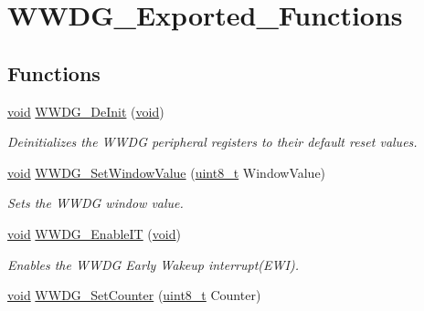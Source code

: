\hypertarget{group___w_w_d_g___exported___functions}{}\section{W\+W\+D\+G\+\_\+\+Exported\+\_\+\+Functions}
\label{group___w_w_d_g___exported___functions}
\subsection*{Functions}
\begin{DoxyCompactItemize}
\item 
\hyperlink{usb__devapi_8h_afabf60e7f57651d6d595a02c75f07cd0}{void} \hyperlink{group___w_w_d_g___exported___functions_ga7130f4dc861b9234b62e73f9f57f89a1}{W\+W\+D\+G\+\_\+\+De\+Init} (\hyperlink{usb__devapi_8h_afabf60e7f57651d6d595a02c75f07cd0}{void})
\begin{DoxyCompactList}\small\item\em Deinitializes the W\+W\+DG peripheral registers to their default reset values. \end{DoxyCompactList}\item 
\hyperlink{usb__devapi_8h_afabf60e7f57651d6d595a02c75f07cd0}{void} \hyperlink{group___w_w_d_g___exported___functions_gaf44a7bf8bf6b11b41cd89ff521fdd5a5}{W\+W\+D\+G\+\_\+\+Set\+Window\+Value} (\hyperlink{_p_e___types_8h_aba7bc1797add20fe3efdf37ced1182c5}{uint8\+\_\+t} Window\+Value)
\begin{DoxyCompactList}\small\item\em Sets the W\+W\+DG window value. \end{DoxyCompactList}\item 
\hyperlink{usb__devapi_8h_afabf60e7f57651d6d595a02c75f07cd0}{void} \hyperlink{group___w_w_d_g___exported___functions_gac8af66ea5254d3d78b60b9b7c7f29521}{W\+W\+D\+G\+\_\+\+Enable\+IT} (\hyperlink{usb__devapi_8h_afabf60e7f57651d6d595a02c75f07cd0}{void})
\begin{DoxyCompactList}\small\item\em Enables the W\+W\+DG Early Wakeup interrupt(\+E\+W\+I). \end{DoxyCompactList}\item 
\hyperlink{usb__devapi_8h_afabf60e7f57651d6d595a02c75f07cd0}{void} \hyperlink{group___w_w_d_g___exported___functions_ga6e44cc35f133b28b9ad861f459bf8d76}{W\+W\+D\+G\+\_\+\+Set\+Counter} (\hyperlink{_p_e___types_8h_aba7bc1797add20fe3efdf37ced1182c5}{uint8\+\_\+t} Counter)

\end{DoxyCompactItemize}
